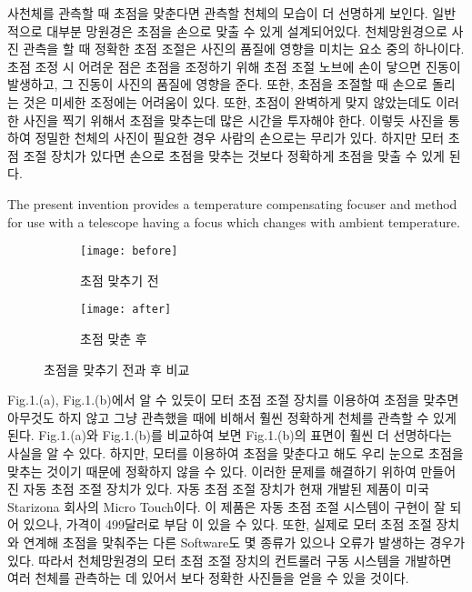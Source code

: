 사천체를 관측할 때 초점을 맞춘다면 관측할 천체의 모습이 더 선명하게 보인다. 일반적으로 대부분 망원경은 초점을 손으로 맞출 수 있게 설계되어있다. 천체망원경으로 사진 관측을 할 때 정확한 초점 조절은 사진의 품질에 영향을 미치는 요소 중의 하나이다. 초점 조정 시 어려운 점은 초점을 조정하기 위해 초점 조절 노브에 손이 닿으면 진동이 발생하고, 그 진동이 사진의 품질에 영향을 준다. 또한, 초점을 조절할 때 손으로 돌리는 것은 미세한 조정에는 어려움이 있다. 또한, 초점이 완벽하게 맞지 않았는데도 이러한 사진을 찍기 위해서 초점을 맞추는데 많은 시간을 투자해야 한다. 이렇듯 사진을 통하여 정밀한 천체의 사진이 필요한 경우 사람의 손으로는 무리가 있다. 하지만 모터 초점 조절 장치가 있다면 손으로 초점을 맞추는 것보다 정확하게 초점을 맞출 수 있게 된다. 

The present invention provides a temperature compensating focuser and method for use with a telescope having a focus which changes with ambient temperature. \cite{persha2001temperature}
\begin{figure}[h]
	\begin{subfigure}{0.5\textwidth}
		\texttt{[image: before]} 
		\caption{초점 맞추기 전}
		\label{fig:before}
	\end{subfigure}
	\begin{subfigure}{0.5\textwidth}
		\texttt{[image: after]}
		\caption{초점 맞춘 후}
		\label{fig:after}
	\end{subfigure}
	\caption{초점을 맞추기 전과 후 비교}
	\label{fig:image1}
\end{figure}






Fig.1.(a), Fig.1.(b)에서 알 수 있듯이 모터 초점 조절 장치를 이용하여 초점을 맞추면 아무것도 하지 않고 그냥 관측했을 때에 비해서 훨씬 정확하게 천체를 관측할 수 있게 된다. Fig.1.(a)와 Fig.1.(b)를 비교하여 보면 Fig.1.(b)의 표면이 훨씬 더 선명하다는 사실을 알 수 있다. 하지만, 모터를 이용하여 초점을 맞춘다고 해도 우리 눈으로 초점을 맞추는 것이기 때문에 정확하지 않을 수 있다. 이러한 문제를 해결하기 위하여 만들어진 자동 초점 조절 장치가 있다. 자동 초점 조절 장치가 현재 개발된 제품이 미국 Starizona 회사의 Micro Touch이다. 이 제품은 자동 초점 조절 시스템이 구현이 잘 되어 있으나, 가격이 499달러로 부담 이 있을 수 있다. 또한, 실제로 모터 초점 조절 장치와 연계해 초점을 맞춰주는 다른 Software도 몇 종류가 있으나 오류가 발생하는 경우가 있다. 따라서 천체망원경의 모터 초점 조절 장치의 컨트롤러 구동 시스템을 개발하면 여러 천체를 관측하는 데 있어서 보다 정확한 사진들을 얻을 수 있을 것이다.

